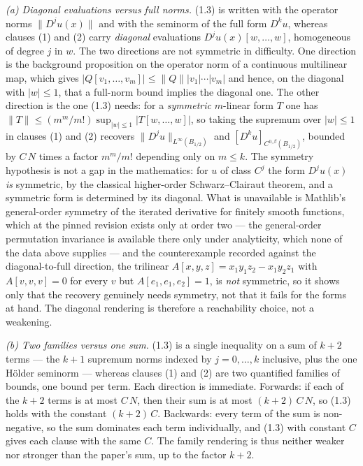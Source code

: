 \begin{theorem}
\emph{(a) Diagonal evaluations versus full norms.}  (1.3) is written with the operator norms
$\lVert D^{j}u(x)\rVert$ and with the seminorm of the full form $D^{k}u$, whereas clauses (1)
and (2) carry \emph{diagonal} evaluations $D^{j}u(x)[w,\ldots,w]$, homogeneous of degree $j$ in
$w$.  The two directions are not symmetric in difficulty.  One direction is the background
proposition on the operator norm of a continuous multilinear map, which gives
$\lvert Q[v_1,\ldots,v_m]\rvert\le\lVert Q\rVert\lvert v_1\rvert\cdots\lvert v_m\rvert$ and
hence, on the diagonal with $\lvert w\rvert\le1$, that a full-norm bound implies the diagonal
one.  The other direction is the one (1.3) needs: for a \emph{symmetric} $m$-linear form $T$
one has $\lVert T\rVert\le(m^{m}/m!)\sup_{\lvert w\rvert\le1}\lvert T[w,\ldots,w]\rvert$, so
taking the supremum over $\lvert w\rvert\le1$ in clauses (1) and (2) recovers
$\lVert D^{j}u\rVert_{L^{\infty}(B_{1/2})}$ and $[D^{k}u]_{C^{0,\beta}(B_{1/2})}$, bounded by
$C\,N$ times a factor $m^{m}/m!$ depending only on $m\le k$.  The symmetry hypothesis is not a
gap in the mathematics: for $u$ of class $C^{j}$ the form $D^{j}u(x)$ \emph{is} symmetric, by
the classical higher-order Schwarz--Clairaut theorem, and a symmetric form is determined by its
diagonal.  What is unavailable is Mathlib's general-order symmetry of the iterated derivative
for finitely smooth functions, which at the pinned revision exists only at order two --- the
general-order permutation invariance is available there only under analyticity, which none of the
data above supplies --- and the
counterexample recorded against the diagonal-to-full direction, the trilinear
$A[x,y,z]=x_1y_1z_2-x_1y_2z_1$ with $A[v,v,v]=0$ for every $v$ but $A[e_1,e_1,e_2]=1$, is
\emph{not} symmetric, so it shows only that the recovery genuinely needs symmetry, not that it
fails for the forms at hand.  The diagonal rendering is therefore a reachability choice, not a
weakening.

\emph{(b) Two families versus one sum.}  (1.3) is a single inequality on a sum of $k+2$
terms --- the $k+1$ supremum norms indexed by $j=0,\ldots,k$ inclusive, plus the one H\"older
seminorm --- whereas clauses (1) and (2) are two quantified families of bounds, one bound per
term.  Each direction is immediate.  Forwards: if each of the $k+2$ terms is at most $C\,N$,
then their sum is at most $(k+2)\,C\,N$, so (1.3) holds with the constant $(k+2)\,C$.
Backwards: every term of the sum is non-negative, so the sum dominates each term individually,
and (1.3) with constant $C$ gives each clause with the same $C$.  The family rendering is
thus neither weaker nor stronger than the paper's sum, up to the factor $k+2$.


\end{theorem}
